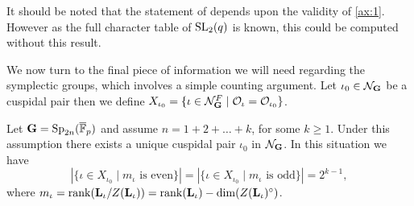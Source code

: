 \documentclass{jt-calcs}
\begin{document}
\begin{rem}
It should be noted that the statement of \cite[Proposition 2.8]{digne-lehrer-michel:1997:gelfand-grave-characters-disconnected} depends upon the validity of \ref{ax:1}. However as the full character table of $\operatorname{SL}_2(q)$ is known, this could be computed without this result.
\end{rem}

We now turn to the final piece of information we will need regarding the symplectic groups, which involves a simple counting argument. Let $\iota_0 \in \mathcal{N}_{\mathbf{G}}$ be a cuspidal pair then we define $X_{\iota_0} = \{\iota \in \mathcal{N}_{\mathbf{G}}^F \mid \mathcal{O}_{\iota} = \mathcal{O}_{\iota_0}\}$.

\begin{lem}\label{lem:sp-odd-even}
Let $\mathbf{G} = \operatorname{Sp}_{2n}(\overline{\mathbb{F}}_p)$ and assume $n = 1 + 2 + \dots + k$, for some $k \geqslant 1$. Under this assumption there exists a unique cuspidal pair $\iota_0$ in $\mathcal{N}_{\mathbf{G}}$. In this situation we have
\begin{equation*}
|\{\iota \in X_{\iota_0} \mid m_{\iota}\text{ is even}\}| = |\{\iota \in X_{\iota_0} \mid m_{\iota}\text{ is odd}\}| = 2^{k-1},
\end{equation*}
where $m_\iota = \operatorname{rank}(\mathbf{L}_{\iota}/Z(\mathbf{L}_{\iota})) = \operatorname{rank}(\mathbf{L}_{\iota}) - \dim(Z(\mathbf{L}_{\iota})^{\circ})$.
\end{lem}
\end{document}
